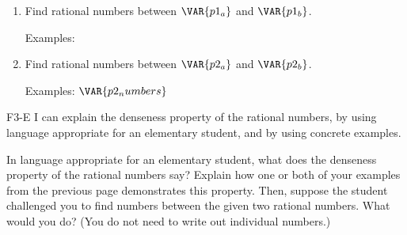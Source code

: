 
\begin{enumerate}
    \item Find  rational numbers between $\VAR{p1_a}$ and $\VAR{p1_b}$. 

    \vfill


    \vfill
    \begin{ansenv}
        Examples:\newline
        \vspace{12pt}
        \noindent
        \noindent
    \end{ansenv}
    \vfill

    \item Find  rational numbers between $\VAR{p2_a}$ and $\VAR{p2_b}$.

    \vfill
    \vfill
    \begin{ansenv}
        Examples:\newline
        \vspace{12pt}
        \noindent
        $\VAR{p2_numbers}$
    \end{ansenv}
    \vfill
    \vfill
    \vfill
\end{enumerate}

\newpage

\begin{setskill}{F3-E}
    I can explain the denseness property of the rational numbers, by using language appropriate for an elementary student, and by using concrete examples.
\end{setskill}

In language appropriate for an elementary student, what does the denseness property of the rational numbers say? Explain how one or both of your examples from the previous page demonstrates this property. Then, suppose the student challenged you to find  numbers between the given two rational numbers. What would you do? (You do not need to write out  individual numbers.)